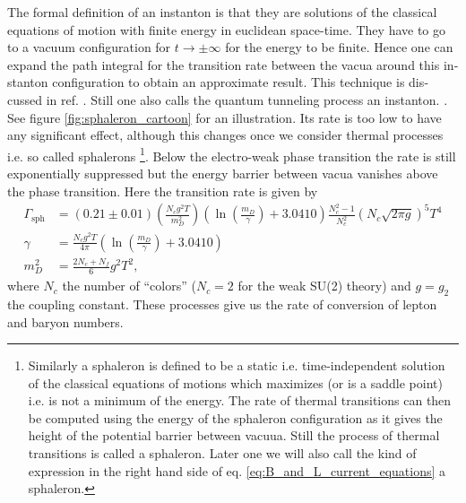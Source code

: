 \documentclass[master,       %
               twoside,        %
               BCOR10mm,       %
               english,ngerman, %
               ]{GAUBM}
\begin{document}
\begin{otherlanguage}{english}
{The formal definition of an instanton is that they are solutions of the classical equations of motion with finite energy in euclidean space-time. They have to go to a vacuum configuration for $t \to \pm \infty$ for the energy to be finite. Hence one can expand the path integral for the transition rate between the vacua around this instanton configuration to obtain an approximate result. This technique is discussed in ref. \cite[chap. 7]{aspects_of_symmmetry}. Still one also calls the quantum tunneling process an instanton.
}. See figure \ref{fig:sphaleron_cartoon} for an illustration.
Its rate is too low to have any significant effect, although this changes once we consider thermal processes i.e. so called sphalerons \footnote{
Similarly a sphaleron is defined to be a static i.e. time-independent solution of the classical equations of motions which maximizes (or is a saddle point) i.e. is not a minimum of the energy.
The rate of thermal transitions can then be computed using the energy of the sphaleron configuration as it gives the height of the potential barrier between vacuua.
Still the process of thermal transitions is called a sphaleron. Later one we will also call the kind of expression in the right hand side of eq. \eqref{eq:B_and_L_current_equations} a sphaleron.
}.
Below the electro-weak phase transition the rate is still exponentially suppressed but the energy barrier between vacua vanishes above the phase transition. Here the transition rate is given by \cite{sphaleron_rate_symmetric_phase_Moore_2011}
\begin{align}
	\Gamma_{\mathrm{sph}} &= (0.21 \pm 0.01) \left(\frac{N_c g^2 T}{m_D^2} \right) \left(\ln \left(\frac{m_D}{\gamma} \right) + 3.0410 \right) \frac{N_c^2 - 1}{N_c^2} (N_c \sqrt{2 \pi g})^5 T^4 \\
	\gamma &= \frac{N_c g^2 T}{4 \pi} \left(\ln \left(\frac{m_D}{\gamma}\right) + 3.0410 \right) \nonumber \\
	m_D^2 &= \frac{2N_c + N_f}{6} g^2 T^2 \nonumber,
\end{align}
where $N_c$ the number of ``colors'' ($N_c = 2$ for the weak SU(2) theory) and $g = g_2$ the coupling constant.
These processes give us the rate of conversion of lepton and baryon numbers.


\end{otherlanguage}
\end{document}
